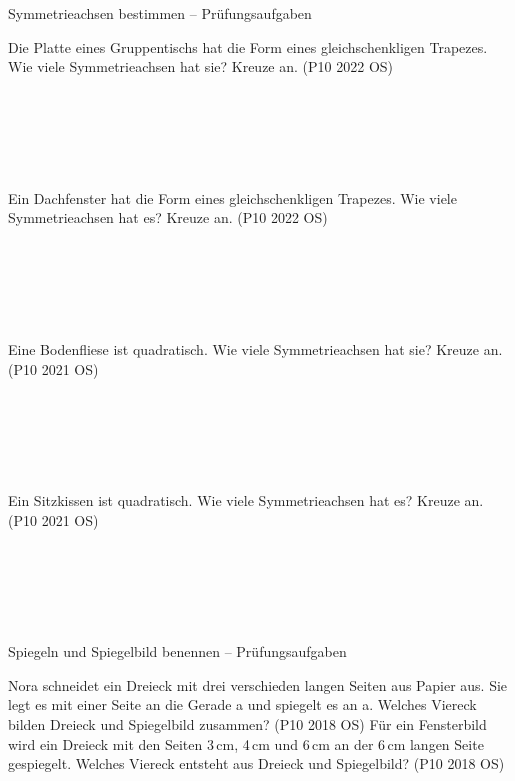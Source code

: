 \begin{aufgabe}{Symmetrieachsen bestimmen – Prüfungsaufgaben}
\begin{teile}
\teil Die Platte eines Gruppentischs hat die Form eines gleichschenkligen Trapezes. Wie viele Symmetrieachsen hat sie? Kreuze an. \hfill (P10 2022 OS) \\  \\  \\  \\  \\  \\ 

\teil Ein Dachfenster hat die Form eines gleichschenkligen Trapezes. Wie viele Symmetrieachsen hat es? Kreuze an. \hfill (P10 2022 OS) \\  \\  \\  \\  \\  \\ 

\teil Eine Bodenfliese ist quadratisch. Wie viele Symmetrieachsen hat sie? Kreuze an. \hfill (P10 2021 OS) \\  \\  \\  \\  \\  \\ 

\teil Ein Sitzkissen ist quadratisch. Wie viele Symmetrieachsen hat es? Kreuze an. \hfill (P10 2021 OS) \\  \\  \\  \\  \\  \\ 

\end{teile}
\end{aufgabe}

\begin{aufgabe}{Spiegeln und Spiegelbild benennen – Prüfungsaufgaben}
\begin{teile}
\teil Nora schneidet ein Dreieck mit drei verschieden langen Seiten aus Papier aus. Sie legt es mit einer Seite an die Gerade a und spiegelt es an a. Welches Viereck bilden Dreieck und Spiegelbild zusammen? \hfill (P10 2018 OS)
\teil Für ein Fensterbild wird ein Dreieck mit den Seiten 3\,cm, 4\,cm und 6\,cm an der 6\,cm langen Seite gespiegelt. Welches Viereck entsteht aus Dreieck und Spiegelbild? \hfill (P10 2018 OS)
\end{teile}
\end{aufgabe}
